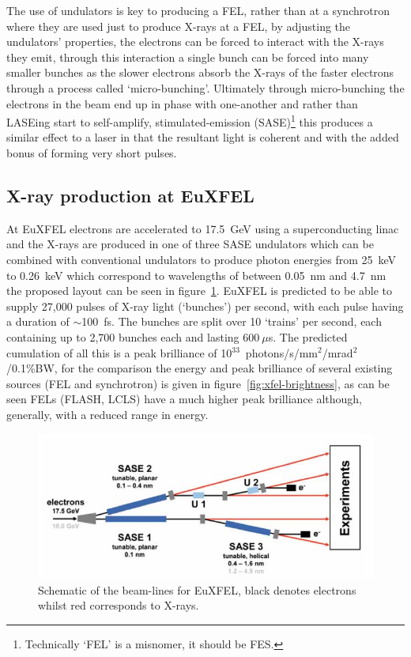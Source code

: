 The use of undulators is key to producing a FEL, rather than at a synchrotron where they are used just to produce X-rays at a FEL, by adjusting the undulators' properties, the electrons can be forced to interact with the X-rays they emit, through this interaction a single bunch can be forced into many smaller bunches as the slower electrons absorb the X-rays of the faster electrons through a process called `micro-bunching'. Ultimately through micro-bunching the electrons in the beam end up in phase with one-another and rather than LASEing start to self-amplify, stimulated-emission (SASE)\footnote{Technically `FEL' is a misnomer, it should be FES.} this produces a similar effect to a laser in that the resultant light is coherent and with the added bonus of forming very short pulses.
\subsection{X-ray production at EuXFEL} %
\label{sub:x_ray_production_at_euxfel}
At EuXFEL electrons are accelerated to 17.5~GeV using a superconducting linac and the X-rays are produced in one of three SASE undulators which can be combined with conventional undulators to produce photon energies from 25~keV to 0.26~keV which correspond to wavelengths of between 0.05~nm and 4.7~nm the proposed layout can be seen in figure~\ref{fig:XFEL_layout}. EuXFEL is predicted to be able to supply 27,000 pulses of X-ray light (`bunches') per second, with each pulse having a duration of \( \sim \)100~fs. The bunches are split over 10 `trains' per second, each containing up to 2,700 bunches each and lasting \( 600~\mu\)s. The predicted cumulation of all this is a peak brilliance of 10\(^{33}\)~photons/s/mm\(^2\)/mrad\(^2\)/0.1\%BW, for the comparison the energy and peak brilliance of several existing sources (FEL and synchrotron) is given in figure~\ref{fig:xfel-brightness}, as can be seen FELs (FLASH, LCLS) have a much higher peak brilliance although, generally, with a reduced range in energy.
\begin{figure}[h]
  \centering
    \includegraphics[width=.9\textwidth]{appendix_XFEL/images/Other/XFEL_layout.png}
  \caption{Schematic of the beam-lines for EuXFEL, black denotes electrons whilst red corresponds to X-rays.}
  \label{fig:XFEL_layout}
\end{figure}

